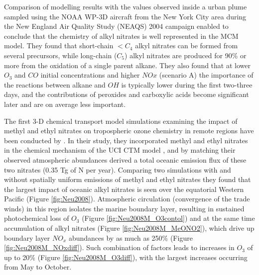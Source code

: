 \documentclass[11pt,a4paper]{article}
\begin{document}
Comparison of modelling results with the values observed inside a urban plume sampled using the NOAA WP-3D aircraft from the New York City area during the New England Air Quality Study (NEAQS) 2004 campaign enabled \cite{Sommariva2008} to conclude that the chemistry of alkyl nitrates is well represented in the MCM model. They found that short-chain $<C_4$ alkyl nitrates can be formed from several precursors, while long-chain ($C_5$) alkyl nitrates are produced for 90\% or more from the oxidation of a single parent alkane. They also found that at lower $O_3$ and $CO$ initial concentrations and higher $NOx$ (scenario A) the importance of the reactions between alkane and $OH$ is typically lower during the first two-three days, and the contributions of peroxides and carboxylic acids become significant later and are on average less important.

The first 3-D chemical transport  model simulations examining the impact of methyl and ethyl nitrates on tropospheric ozone chemistry in remote regions have been conducted by \cite{Neu2008}. In their study, they incorporated methyl and ethyl nitrates in the chemical mechanism of the UCI CTM model \citep{Carver1997}, and by matching their observed atmospheric abundances derived a total oceanic emission flux of these two nitrates (0.35 Tg of N per year). Comparing two simulations with and without spatially uniform emissions of methyl and ethyl nitrates they found that the largest impact of oceanic alkyl nitrates is seen over the equatorial Western Pacific (Figure \ref{fig:Neu2008}). Atmospheric circulation (convergence of the trade winds) in this region isolates the marine boundary layer, resulting in sustained photochemical loss of $O_3$ (Figure \ref{fig:Neu2008M_O3contol}) and at the same time accumulation of alkyl nitrates (Figure \ref{fig:Neu2008M_MeONO2}), which drive up boundary layer $NO_x$ abundances by as much as 250\% (Figure \ref{fig:Neu2008M_NOxdiff}). Such combination of factors leads to increases in $O_3$ of up to 20\% (Figure \ref{fig:Neu2008M_O3diff}), with the largest increases occurring from May to October.
\end{document}
